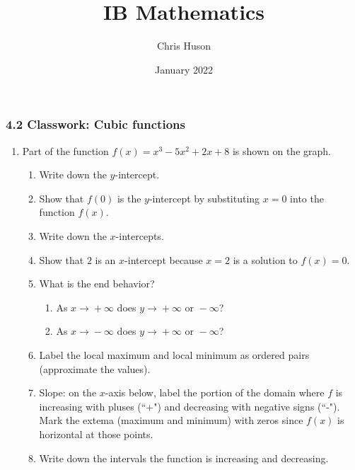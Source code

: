 \documentclass[12pt, twoside]{article}
\title{IB Mathematics}
\author{Chris Huson}
\date{January 2022}
\begin{document}
\subsubsection*{4.2 Classwork: Cubic functions}
\begin{enumerate}
    \item Part of the function $f(x)=x^3-5x^2+2x+8$ is shown on the graph.\\

\begin{enumerate}
  \item Write down the $y$-intercept.
  \item Show that $f(0)$ is the $y$-intercept by substituting $x=0$ into the function $f(x)$.\vspace{1cm}
  \item Write down the $x$-intercepts.
  \item Show that $2$ is an $x$-intercept because $x=2$ is a solution to $f(x)=0$.\vspace{1cm}
  \item What is the end behavior?
  \begin{enumerate}
      \item As $x\xrightarrow{}+\infty$ does $y\xrightarrow{}+\infty \text{ or } -\infty$?
      \item As $x\xrightarrow{}-\infty$ does $y\xrightarrow{}+\infty \text{ or } -\infty$?
  \end{enumerate}
  \item Label the local maximum and local minimum as ordered pairs (approximate the values).
  \item Slope: on the $x$-axis below, label the portion of the domain where $f$ is increasing with pluses (``+") and decreasing with negative signs (``-"). Mark the extema (maximum and minimum) with zeros since $f(x)$ is horizontal at those points.
  \item Write down the intervals the function is increasing and decreasing.
\end{enumerate}


\end{enumerate}
\end{document}

